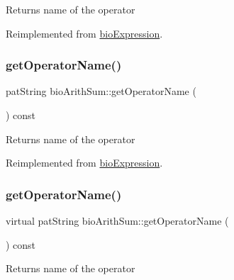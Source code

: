 \begin{DoxyReturn}{Returns}
name of the operator 
\end{DoxyReturn}


Reimplemented from \hyperlink{classbio_expression_a2353a4afb3a2b0af7c63aba086a72bde}{bio\+Expression}.

\mbox{\label{classbio_arith_sum_a3bebc8a594c98febfad645befc1e6afa}} 
\subsubsection{\texorpdfstring{get\+Operator\+Name()}{getOperatorName()}\hspace{0.1cm}{\footnotesize\ttfamily [2/4]}}
{\footnotesize\ttfamily pat\+String bio\+Arith\+Sum\+::get\+Operator\+Name (\begin{DoxyParamCaption}{ }\end{DoxyParamCaption}) const\hspace{0.3cm}{\ttfamily [virtual]}}

\begin{DoxyReturn}{Returns}
name of the operator 
\end{DoxyReturn}


Reimplemented from \hyperlink{classbio_expression_a2353a4afb3a2b0af7c63aba086a72bde}{bio\+Expression}.

\mbox{\label{classbio_arith_sum_a9e0ab0b9062a7cd80e70fc16505bc282}} 
\subsubsection{\texorpdfstring{get\+Operator\+Name()}{getOperatorName()}\hspace{0.1cm}{\footnotesize\ttfamily [3/4]}}
{\footnotesize\ttfamily virtual pat\+String bio\+Arith\+Sum\+::get\+Operator\+Name (\begin{DoxyParamCaption}{ }\end{DoxyParamCaption}) const\hspace{0.3cm}{\ttfamily [virtual]}}

\begin{DoxyReturn}{Returns}
name of the operator 
\end{DoxyReturn}


